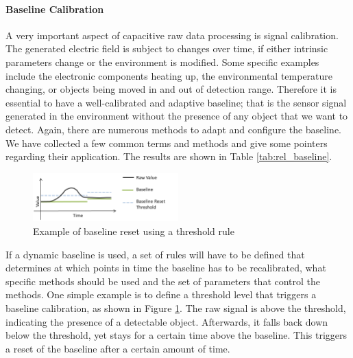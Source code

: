 \paragraph{Baseline Calibration}
A very important aspect of capacitive raw data processing is signal calibration. The generated electric field is subject to changes over time, if either intrinsic parameters change or the environment is modified. Some specific examples include the electronic components heating up, the environmental temperature changing, or objects being moved in and out of detection range. Therefore it is essential to have a well-calibrated and adaptive baseline; that is the sensor signal generated in the environment without the presence of any object that we want to detect. Again, there are numerous methods to adapt and configure the baseline. We have collected a few common terms and methods and give some pointers regarding their application. The results are shown in Table \ref{tab:rel_baseline}. 
\begin{figure}[h]
\centering
\includegraphics[width=0.5\textwidth]{images/baseline_reset}
\caption{Example of baseline reset using a threshold rule}
\label{fig:rel_base_reset}
\end{figure} 
If a dynamic baseline is used, a set of rules will have to be defined that determines at which points in time the baseline has to be recalibrated, what specific methods should be used and the set of parameters that control the methods. One simple example is to define a threshold level that triggers a baseline calibration, as shown in Figure \ref{fig:rel_base_reset}. The raw signal is above the threshold, indicating the presence of a detectable object. Afterwards, it falls back down below the threshold, yet stays for a certain time above the baseline. This triggers a reset of the baseline after a certain amount of time.

